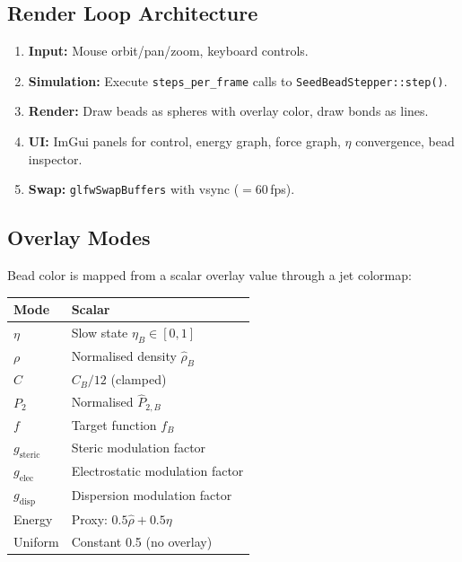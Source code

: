 \documentclass[11pt, a4paper, oneside]{article}
\newcommand{\type}[1]{\texttt{#1}}
\newcommand{\field}[1]{\texttt{#1}}
\begin{document}
\subsection{Render Loop Architecture}
\label{sec:render-loop}

\begin{enumerate}
  \item \textbf{Input:} Mouse orbit/pan/zoom, keyboard controls.
  \item \textbf{Simulation:} Execute \field{steps\_per\_frame} calls
        to \type{SeedBeadStepper::step()}.
  \item \textbf{Render:} Draw beads as spheres with overlay color,
        draw bonds as lines.
  \item \textbf{UI:} ImGui panels for control, energy graph, force
        graph, $\eta$ convergence, bead inspector.
  \item \textbf{Swap:} \texttt{glfwSwapBuffers} with vsync ($= 60\,$fps).
\end{enumerate}

\subsection{Overlay Modes}
\label{sec:overlay-modes}

Bead color is mapped from a scalar overlay value through a jet colormap:

\begin{center}
\begin{tabular}{ll}
  \toprule
  \textbf{Mode} & \textbf{Scalar} \\
  \midrule
  $\eta$          & Slow state $\eta_B \in [0, 1]$ \\
  $\rho$          & Normalised density $\hat{\rho}_B$ \\
  $C$             & $C_B / 12$ (clamped) \\
  $P_2$           & Normalised $\hat{P}_{2,B}$ \\
  $f$             & Target function $f_B$ \\
  $g_{\text{steric}}$ & Steric modulation factor \\
  $g_{\text{elec}}$   & Electrostatic modulation factor \\
  $g_{\text{disp}}$   & Dispersion modulation factor \\
  Energy          & Proxy: $0.5\hat{\rho} + 0.5\eta$ \\
  Uniform         & Constant 0.5 (no overlay) \\
  \bottomrule
\end{tabular}
\end{center}
\end{document}
